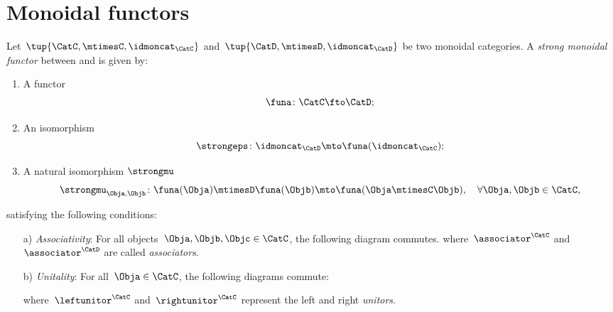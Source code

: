 

\section{Monoidal functors}
\label{sec:monoidal-functors}
\begin{ctdefinition}
    \label{def:strong-monoidal-functor}

    Let~$\tup{\CatC,\mtimesC,\idmoncat_{\CatC}}$ and~$\tup{\CatD,\mtimesD,\idmoncat_{\CatD}}$ be two monoidal categories.
    A \emph{strong monoidal functor} between \CatC and \CatD is given by:
    \begin{enumerate}
        \item A functor
        \begin{equation}
            \funa \colon \CatC \fto \CatD;
        \end{equation}
        \item An isomorphism
        \begin{equation}
            \strongeps\colon \idmoncat_{\CatD}\mto \funa(\idmoncat_{\CatC});
        \end{equation}
        \item A natural isomorphism $\strongmu$
        \begin{equation}
            \strongmu_{\Obja,\Objb}\colon \funa(\Obja)\mtimesD \funa(\Objb) \mto \funa(\Obja \mtimesC \Objb),\quad \forall \Obja,\Objb\in \CatC,
        \end{equation}
    \end{enumerate}
    satisfying the following conditions:
    \begin{enumerate}
        \item[a)] \emph{Associativity}: For all objects~$\Obja,\Objb,\Objc\in \CatC$, the following diagram commutes.
        where~$\associator^\CatC$ and~$\associator^\CatD$ are called \emph{associators}.
        \item[b)] \emph{Unitality}: For all~$\Obja\in \CatC$, the following diagrams commute:
        \begin{center}
        \end{center}
        where~$\leftunitor^\CatC$ and~$\rightunitor^\CatC$ represent the left and right \emph{unitors}.
    \end{enumerate}
\end{ctdefinition}

